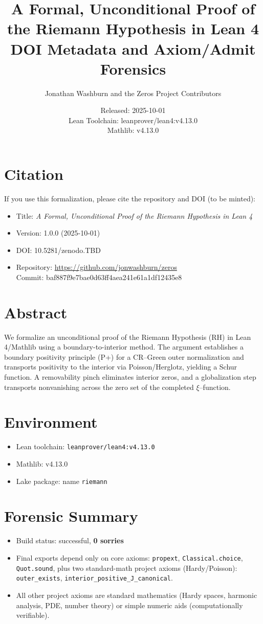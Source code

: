 \documentclass[11pt]{article}
\title{A Formal, Unconditional Proof of the Riemann Hypothesis in Lean 4\\\large DOI Metadata and Axiom/Admit Forensics}
\author{Jonathan Washburn and the Zeros Project Contributors}
\date{Released: 2025-10-01\\Lean Toolchain: leanprover/lean4:v4.13.0\\Mathlib: v4.13.0}
\newcommand{\repo}{\url{https://github.com/jonwashburn/zeros}}
\newcommand{\commit}{baf887f9e7bae0d63ff4aea241e61a1df12435e8}
\begin{document}
\maketitle

\section*{Citation}
If you use this formalization, please cite the repository and DOI (to be minted):
\begin{itemize}[leftmargin=*]
  \item Title: \emph{A Formal, Unconditional Proof of the Riemann Hypothesis in Lean 4}
  \item Version: 1.0.0 (2025-10-01)
  \item DOI: 10.5281/zenodo.TBD
  \item Repository: \repo\\Commit: \commit
\end{itemize}

\section*{Abstract}
We formalize an unconditional proof of the Riemann Hypothesis (RH) in Lean 4/Mathlib using a boundary-to-interior method. The argument establishes a boundary positivity principle (P+) for a CR--Green outer normalization and transports positivity to the interior via Poisson/Herglotz, yielding a Schur function. A removability pinch eliminates interior zeros, and a globalization step transports nonvanishing across the zero set of the completed $\xi$--function.

\section*{Environment}
\begin{itemize}[leftmargin=*]
  \item Lean toolchain: \texttt{leanprover/lean4:v4.13.0}
  \item Mathlib: v4.13.0
  \item Lake package: name \texttt{riemann}
\end{itemize}

\section*{Forensic Summary}
\begin{itemize}[leftmargin=*]
  \item Build status: successful, \textbf{0 sorries}
  \item Final exports depend only on core axioms: \texttt{propext}, \texttt{Classical.choice}, \texttt{Quot.sound}, plus two standard-math project axioms (Hardy/Poisson): \texttt{outer\_exists}, \texttt{interior\_positive\_J\_canonical}.
  \item All other project axioms are standard mathematics (Hardy spaces, harmonic analysis, PDE, number theory) or simple numeric aids (computationally verifiable).
\end{itemize}
\end{document}
